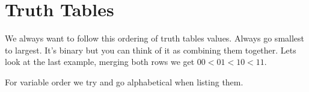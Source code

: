 \section{Truth Tables}
We always want to follow this ordering of truth tables values. Always go smallest to largest. It's binary but you can think of it as combining them together. Lets look at the last example, merging both rows we get $00 < 01 < 10 < 11$.

For variable order we try and go alphabetical when listing them.

